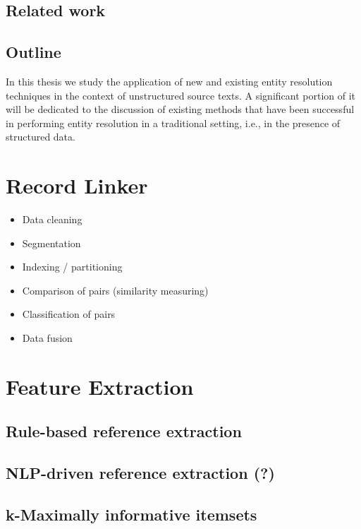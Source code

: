 \documentclass[paper=a4, fontsize=11pt]{scrartcl}					%
\numberwithin{equation}{section}					%
\numberwithin{figure}{section}						%
\numberwithin{table}{section}						%
\begin{document}
\subsection{Related work}

\subsection{Outline}
In this thesis we study the application of new and existing entity resolution techniques in the context of unstructured source texts. A significant portion of it will be dedicated to the discussion of existing methods that have been successful in performing entity resolution in a traditional setting, i.e., in the presence of structured data.



\section{Record Linker}

\begin{itemize}
	\item Data cleaning
	\item Segmentation
	\item Indexing / partitioning
	\item Comparison of pairs (similarity measuring)
	\item Classification of pairs
	\item Data fusion
\end{itemize}




\section{Feature Extraction}

\subsection{Rule-based reference extraction}

\subsection{NLP-driven reference extraction (?)}

\subsection{k-Maximally informative itemsets}
\end{document}
